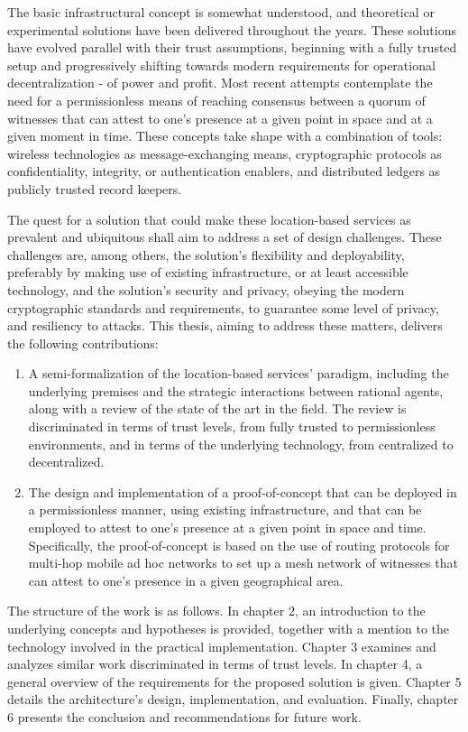 The basic infrastructural concept is somewhat understood, and theoretical or experimental solutions have been delivered throughout the years. These solutions have evolved parallel with their trust assumptions, beginning with a fully trusted setup and progressively shifting towards modern requirements for operational decentralization - of power and profit. Most recent attempts contemplate the need for a permissionless means of reaching consensus between a quorum of witnesses that can attest to one's presence at a given point in space and at a given moment in time. These concepts take shape with a combination of tools: wireless technologies as message-exchanging means, cryptographic protocols as confidentiality, integrity, or authentication enablers, and distributed ledgers as publicly trusted record keepers. 

The quest for a solution that could make these location-based services as prevalent and ubiquitous shall aim to address a set of design challenges. These challenges are, among others, the solution's flexibility and deployability, preferably by making use of existing infrastructure, or at least accessible technology, and the solution's security and privacy, obeying the modern cryptographic standards and requirements, to guarantee some level of privacy, and resiliency to attacks. This thesis, aiming to address these matters, delivers the following contributions:
\begin{enumerate}
\item A semi-formalization of the location-based services' paradigm, including the underlying premises and the strategic interactions between rational agents, along with a review of the state of the art in the field. The review is discriminated in terms of trust levels, from fully trusted to permissionless environments, and in terms of the underlying technology, from centralized to decentralized.
\item The design and implementation of a proof-of-concept that can be deployed in a permissionless manner, using existing infrastructure, and that can be employed to attest to one's presence at a given point in space and time. Specifically, the proof-of-concept is based on the use of routing protocols for multi-hop mobile ad hoc networks to set up a mesh network of witnesses that can attest to one's presence in a given geographical area.
\end{enumerate}

The structure of the work is as follows. In chapter 2, an introduction to the underlying concepts and hypotheses is provided, together with a mention to the technology involved in the practical implementation. Chapter 3 examines and analyzes similar work discriminated in terms of trust levels. In chapter 4, a general overview of the requirements for the proposed solution is given. Chapter 5 details the architecture's design, implementation, and evaluation. Finally, chapter 6 presents the conclusion and recommendations for future work.
